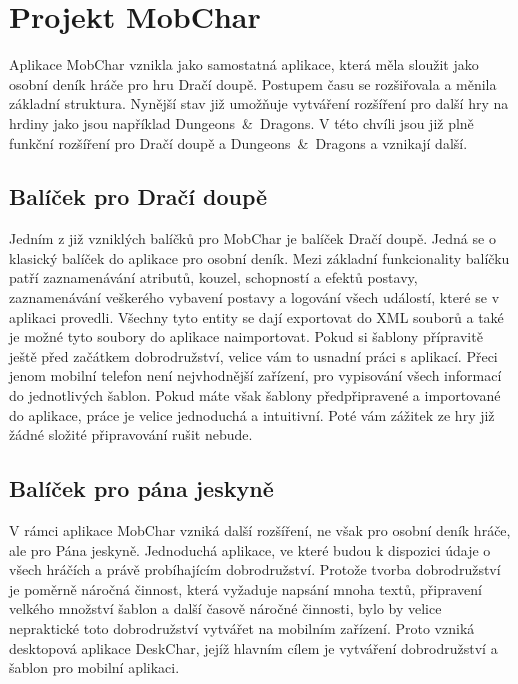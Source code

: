 \documentclass[thesis=B,czech]{resources/FITthesis}[2012/06/26]
\begin{document}
\section{Projekt MobChar}	
Aplikace MobChar vznikla jako samostatná aplikace, která měla sloužit jako osobní deník hráče pro hru Dračí doupě. Postupem času se rozšiřovala a měnila základní struktura. Nynější stav již umožňuje vytváření rozšíření pro další hry na hrdiny jako jsou například Dungeons~\&~Dragons. V této chvíli jsou již plně funkční rozšíření pro Dračí doupě a Dungeons~\&~Dragons a vznikají další.

\subsection{Balíček pro Dračí doupě}
Jedním z již vzniklých balíčků pro MobChar je balíček Dračí doupě. Jedná se o klasický balíček do aplikace pro osobní deník. Mezi základní funkcionality balíčku patří zaznamenávání atributů, kouzel, schopností a efektů postavy, zaznamenávání veškerého vybavení postavy a logování všech událostí, které se v aplikaci provedli. Všechny tyto entity se dají exportovat do XML souborů a také je možné tyto soubory do aplikace naimportovat. Pokud si šablony přípravitě ještě před začátkem dobrodružství, velice vám to usnadní práci s aplikací. Přeci jenom mobilní telefon není nejvhodnější zařízení, pro vypisování všech informací do jednotlivých šablon. Pokud máte však šablony předpřipravené a importované do aplikace, práce je velice jednoduchá a intuitivní. Poté vám zážitek ze hry již žádné složité připravování rušit nebude. 

\subsection{Balíček pro pána jeskyně}
V rámci aplikace MobChar vzniká další rozšíření, ne však pro osobní deník hráče, ale pro Pána jeskyně. Jednoduchá aplikace, ve které budou k dispozici údaje o všech hráčích a právě probíhajícím dobrodružství. Protože tvorba dobrodružství je poměrně náročná činnost, která vyžaduje napsání mnoha textů, připravení velkého množství šablon a další časově náročné činnosti, bylo by velice nepraktické toto dobrodružství vytvářet na mobilním zařízení. Proto vzniká desktopová aplikace DeskChar, jejíž hlavním cílem je vytváření dobrodružství a šablon pro mobilní aplikaci.
\end{document}
